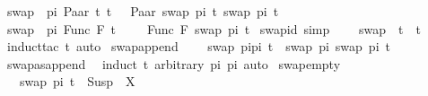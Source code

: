 \begin{isabellebody}
{\isacharbar}{\kern0pt}\ {\isachardoublequoteopen}swap\ \ pi\ {\isacharparenleft}{\kern0pt}Paar\ t{}\ t{}{\isacharparenright}{\kern0pt}\ \ {\isacharequal}{\kern0pt}\ Paar\ {\isacharparenleft}{\kern0pt}swap\ pi\ t{}{\isacharparenright}{\kern0pt}\ {\isacharparenleft}{\kern0pt}swap\ pi\ t{}{\isacharparenright}{\kern0pt}{\isachardoublequoteclose}\isanewline
{\isacharbar}{\kern0pt}\ {\isachardoublequoteopen}swap\ \ pi\ {\isacharparenleft}{\kern0pt}Func\ F\ t{\isacharparenright}{\kern0pt}\ \ \ \ {\isacharequal}{\kern0pt}\ Func\ F\ {\isacharparenleft}{\kern0pt}swap\ pi\ t{\isacharparenright}{\kern0pt}{\isachardoublequoteclose}\isanewline
\isanewline
{}\isamarkupfalse%
\ swap{\isacharunderscore}{\kern0pt}id\ {\isacharbrackleft}{\kern0pt}simp{\isacharbrackright}{\kern0pt}{\isacharcolon}{\kern0pt}\ \isanewline
\ \ \ {\isachardoublequoteopen}swap\ {\isacharbrackleft}{\kern0pt}{\isacharbrackright}{\kern0pt}\ t\ {\isacharequal}{\kern0pt}\ t{\isachardoublequoteclose}\isanewline
%
\isadelimproof
\ \ %
\endisadelimproof
%
\isatagproof
{}\isamarkupfalse%
\ {\isacharparenleft}{\kern0pt}induct{\isacharunderscore}{\kern0pt}tac\ t{\isacharparenright}{\kern0pt}\ {\isacharparenleft}{\kern0pt}auto{\isacharparenright}{\kern0pt}%
\endisatagproof
{\isafoldproof}%
%
\isadelimproof
\isanewline
%
\endisadelimproof
\isanewline
\isanewline
{}\isamarkupfalse%
\ swap{\isacharunderscore}{\kern0pt}append{\isacharcolon}{\kern0pt}\ \isanewline
\ \ \ {\isachardoublequoteopen}swap\ {\isacharparenleft}{\kern0pt}pi{}{\isacharat}{\kern0pt}pi{}{\isacharparenright}{\kern0pt}\ t\ {\isacharequal}{\kern0pt}\ swap\ pi{}\ {\isacharparenleft}{\kern0pt}swap\ pi{}\ t{\isacharparenright}{\kern0pt}{\isachardoublequoteclose}\isanewline
%
\isadelimproof
\ \ %
\endisadelimproof
%
\isatagproof
{}\isamarkupfalse%
\ swapas{\isacharunderscore}{\kern0pt}append\ \isamarkupfalse%
\ {\isacharparenleft}{\kern0pt}induct\ t\ arbitrary{\isacharcolon}{\kern0pt}\ pi{}\ pi{}{\isacharparenright}{\kern0pt}\ auto%
\endisatagproof
{\isafoldproof}%
%
\isadelimproof
\isanewline
%
\endisadelimproof
\isanewline
\isanewline
{}\isamarkupfalse%
\ swap{\isacharunderscore}{\kern0pt}empty{\isacharcolon}{\kern0pt}\ \isanewline
\ \ \ {\isachardoublequoteopen}swap\ pi\ t\ {\isacharequal}{\kern0pt}\ Susp\ {\isacharbrackleft}{\kern0pt}{\isacharbrackright}{\kern0pt}\ X{\isachardoublequoteclose}\ \isanewline

\end{isabellebody}
